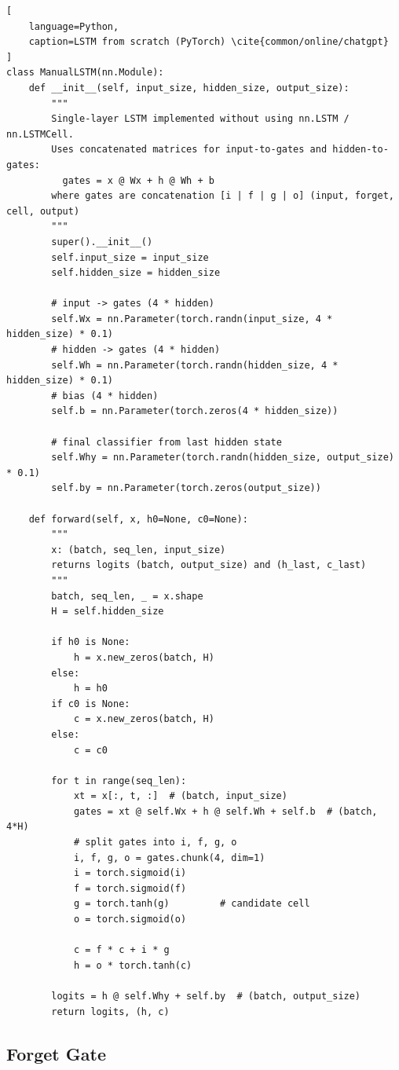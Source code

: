 \begin{lstlisting}[
    language=Python,
    caption=LSTM from scratch (PyTorch) \cite{common/online/chatgpt}
]
class ManualLSTM(nn.Module):
    def __init__(self, input_size, hidden_size, output_size):
        """
        Single-layer LSTM implemented without using nn.LSTM / nn.LSTMCell.
        Uses concatenated matrices for input-to-gates and hidden-to-gates:
          gates = x @ Wx + h @ Wh + b
        where gates are concatenation [i | f | g | o] (input, forget, cell, output)
        """
        super().__init__()
        self.input_size = input_size
        self.hidden_size = hidden_size

        # input -> gates (4 * hidden)
        self.Wx = nn.Parameter(torch.randn(input_size, 4 * hidden_size) * 0.1)
        # hidden -> gates (4 * hidden)
        self.Wh = nn.Parameter(torch.randn(hidden_size, 4 * hidden_size) * 0.1)
        # bias (4 * hidden)
        self.b = nn.Parameter(torch.zeros(4 * hidden_size))

        # final classifier from last hidden state
        self.Why = nn.Parameter(torch.randn(hidden_size, output_size) * 0.1)
        self.by = nn.Parameter(torch.zeros(output_size))

    def forward(self, x, h0=None, c0=None):
        """
        x: (batch, seq_len, input_size)
        returns logits (batch, output_size) and (h_last, c_last)
        """
        batch, seq_len, _ = x.shape
        H = self.hidden_size

        if h0 is None:
            h = x.new_zeros(batch, H)
        else:
            h = h0
        if c0 is None:
            c = x.new_zeros(batch, H)
        else:
            c = c0

        for t in range(seq_len):
            xt = x[:, t, :]  # (batch, input_size)
            gates = xt @ self.Wx + h @ self.Wh + self.b  # (batch, 4*H)
            # split gates into i, f, g, o
            i, f, g, o = gates.chunk(4, dim=1)
            i = torch.sigmoid(i)
            f = torch.sigmoid(f)
            g = torch.tanh(g)         # candidate cell
            o = torch.sigmoid(o)

            c = f * c + i * g
            h = o * torch.tanh(c)

        logits = h @ self.Why + self.by  # (batch, output_size)
        return logits, (h, c)
\end{lstlisting}



\subsection{Forget Gate}

